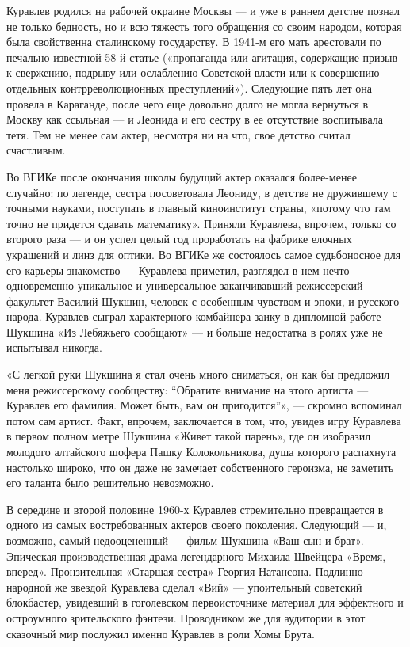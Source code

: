 Куравлев родился на рабочей окраине Москвы — и уже в раннем детстве познал не
только бедность, но и всю тяжесть того обращения со своим народом, которая была
свойственна сталинскому государству. В 1941-м его мать арестовали по печально
известной 58-й статье («пропаганда или агитация, содержащие призыв к свержению,
подрыву или ослаблению Советской власти или к совершению отдельных
контрреволюционных преступлений»). Следующие пять лет она провела в Караганде,
после чего еще довольно долго не могла вернуться в Москву как ссыльная — и
Леонида и его сестру в ее отсутствие воспитывала тетя. Тем не менее сам актер,
несмотря ни на что, свое детство считал счастливым.


Во ВГИКе после окончания школы будущий актер оказался более-менее случайно: по
легенде, сестра посоветовала Леониду, в детстве не дружившему с точными
науками, поступать в главный киноинститут страны, «потому что там точно не
придется сдавать математику». Приняли Куравлева, впрочем, только со второго
раза — и он успел целый год проработать на фабрике елочных украшений и линз для
оптики. Во ВГИКе же состоялось самое судьбоносное для его карьеры знакомство —
Куравлева приметил, разглядел в нем нечто одновременно уникальное и
универсальное заканчивавший режиссерский факультет Василий Шукшин, человек с
особенным чувством и эпохи, и русского народа. Куравлев сыграл характерного
комбайнера-заику в дипломной работе Шукшина «Из Лебяжьего сообщают» — и больше
недостатка в ролях уже не испытывал никогда.

«С легкой руки Шукшина я стал очень много сниматься, он как бы предложил меня
режиссерскому сообществу: \enquote{Обратите внимание на этого артиста — Куравлев его
фамилия. Может быть, вам он пригодится}», — скромно вспоминал потом сам артист.
Факт, впрочем, заключается в том, что, увидев игру Куравлева в первом полном
метре Шукшина «Живет такой парень», где он изобразил молодого алтайского шофера
Пашку Колокольникова, душа которого распахнута настолько широко, что он даже не
замечает собственного героизма, не заметить его таланта было решительно
невозможно.

В середине и второй половине 1960-х Куравлев стремительно превращается в одного
из самых востребованных актеров своего поколения. Следующий — и, возможно,
самый недооцененный — фильм Шукшина «Ваш сын и брат». Эпическая
производственная драма легендарного Михаила Швейцера «Время, вперед».
Пронзительная «Старшая сестра» Георгия Натансона. Подлинно народной же звездой
Куравлева сделал «Вий» — упоительный советский блокбастер, увидевший в
гоголевском первоисточнике материал для эффектного и остроумного зрительского
фэнтези. Проводником же для аудитории в этот сказочный мир послужил именно
Куравлев в роли Хомы Брута.

